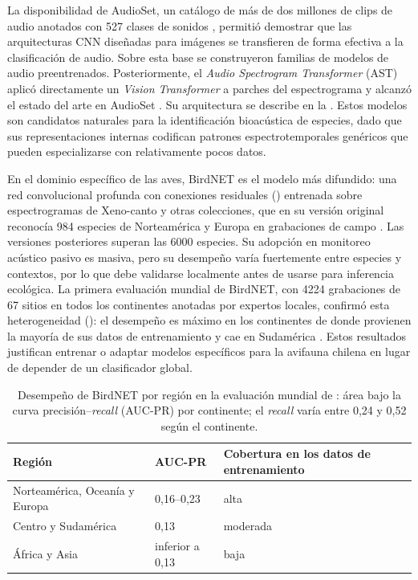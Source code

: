 La disponibilidad de AudioSet, un catálogo de más de dos millones de clips
de audio anotados con 527 clases de sonidos \citep{gemmeke2017audioset},
permitió demostrar que las arquitecturas CNN diseñadas para imágenes
se transfieren de forma efectiva a la clasificación de audio. Sobre esta base se construyeron familias de modelos
de audio preentrenados. Posteriormente, el \textit{Audio Spectrogram
Transformer} (AST) aplicó directamente un \textit{Vision Transformer} a
parches del espectrograma y alcanzó el estado del arte en AudioSet
\citep{gong2021ast}. Su arquitectura se describe en la
. Estos modelos son candidatos naturales para
la identificación bioacústica de especies, dado que sus representaciones
internas codifican patrones espectrotemporales genéricos que pueden
especializarse con relativamente pocos datos.

En el dominio específico de las aves, BirdNET es el modelo más difundido:
una red convolucional profunda con conexiones residuales
() entrenada sobre espectrogramas de Xeno-canto y
otras colecciones, que en su versión original reconocía 984 especies de
Norteamérica y Europa en grabaciones de campo \citep{kahl2021birdnet}. Las
versiones posteriores superan las \num{6000} especies. Su adopción en
monitoreo acústico pasivo es masiva, pero su desempeño varía fuertemente
entre especies y contextos, por lo que debe validarse localmente antes de
usarse para inferencia ecológica. La
primera evaluación mundial de BirdNET, con \num{4224} grabaciones de 67
sitios en todos los continentes anotadas por expertos locales, confirmó esta
heterogeneidad (): el desempeño es máximo en los
continentes de donde provienen la mayoría de sus datos de entrenamiento y
cae en Sudamérica \citep{funosas2026birdnet}. Estos resultados justifican
entrenar o adaptar modelos específicos para la avifauna chilena en lugar de
depender de un clasificador global.

\begin{table}[H]
  \centering\small
  \caption{Desempeño de BirdNET por región en la evaluación mundial de
  \citet{funosas2026birdnet}: área bajo la curva precisión--\textit{recall}
  (AUC-PR) por continente; el \textit{recall} varía entre 0,24 y 0,52 según
  el continente.}
  \label{tab:birdnet}
  \begin{tabular}{@{}l l l@{}}
    \toprule
    Región & AUC-PR & Cobertura en los datos de entrenamiento \\
    \midrule
    Norteamérica, Oceanía y Europa & 0,16--0,23 & alta \\
    Centro y Sudamérica & 0,13 & moderada \\
    África y Asia & inferior a 0,13 & baja \\
    \bottomrule
  \end{tabular}
\end{table}

